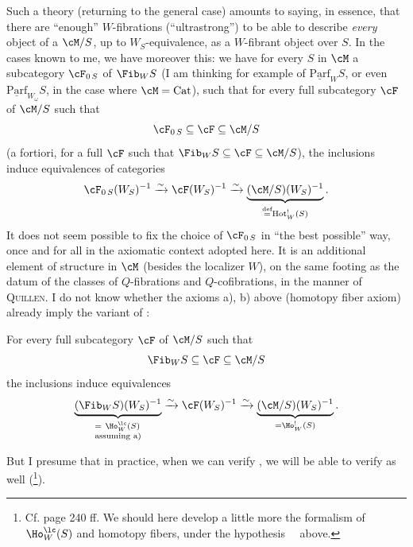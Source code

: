 Such a theory (returning to the general case) amounts to saying, in essence, that there are ``enough'' $W$-fibrations (``ultrastrong'') to be able to describe \textit{every} object of a $\cM/S$, up to $W_S$-equivalence, as a $W$-fibrant object over $S$. In the cases known to me, we have moreover this: we  have for every $S$ in $\cM$ a subcategory $\cF_{0\,S}$ of $\Fib_W S$ (I am thinking for example of $\underline{\mathrm{Parf}}_W S$, or even $\underline{\mathrm{Parf}}_{W_\omega} S$, in the case where $\cM = \mathrm{Cat}$), such that for every full subcategory $\cF$ of $\cM/S$ such that
\[
\cF_{0\,S} \subseteq \cF \subseteq \cM/S
\]
(a fortiori, for a full $\cF$ such that $\Fib_W S \subseteq \cF \subseteq \cM/S$), the inclusions induce equivalences of categories
\[
\cF_{0\,S}(W_S)^{-1} \xrightarrow{\sim} \cF(W_S)^{-1} \xrightarrow{\sim} \underbrace{(\cM/S)(W_S)^{-1}}_{\overset{\text{def}}{=} \mathrm{Hot}^!_W(S)}. %
\]
It does not seem possible to fix the choice of $\cF_{0\,S}$ in ``the best possible'' way, once and for all in the axiomatic context adopted here. It is an additional element of structure in $\cM$ (besides the localizer $W$), on the same footing as the datum of the classes of $Q$-fibrations and $Q$-cofibrations, in the manner of \textsc{Quillen}. I do not know whether the axioms a), b) above (homotopy fiber axiom) already imply  the variant of :

 For every full subcategory $\cF$ of $\cM/S$ such that
\[
\Fib_W S \subseteq \cF \subseteq \cM/S
\]
the inclusions induce equivalences
\[
\underbrace{(\Fib_W S)(W_S)^{-1}}_{\begin{subarray}{l} = \ \Ho^{\lc}_W(S)\\ \text{assuming a)}\end{subarray}} \xrightarrow{\sim} \cF(W_S)^{-1} \xrightarrow{\sim} \underbrace{(\cM/S)(W_S)^{-1}}_{=\Ho^!_W(S)}.
\]

But I presume that in practice, when we can verify , we will be able to verify  as well (\footnote[123]{Cf. page 240 ff. We should here develop a little more the formalism of $\Ho^{\lc}_W(S)$ and homotopy fibers, under the hypothesis \, \ above.}).